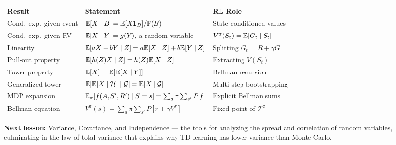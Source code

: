 \documentclass[11pt,a4paper]{article}
\begin{document}
\begin{center}
\renewcommand{\arraystretch}{1.4}
\begin{tabular}{p{4.5cm} p{5cm} p{4.5cm}}
\toprule
\textbf{Result} & \textbf{Statement} & \textbf{RL Role} \\
\midrule
Cond.\ exp.\ given event &
  $\mathbb{E}[X \mid B] = \mathbb{E}[X \mathbf{1}_B]/\mathbb{P}(B)$ &
  State-conditioned values \\
Cond.\ exp.\ given RV &
  $\mathbb{E}[X \mid Y] = g(Y)$, a random variable &
  $V^\pi(S_t) = \mathbb{E}[G_t \mid S_t]$ \\
Linearity &
  $\mathbb{E}[aX + bY \mid Z] = a\mathbb{E}[X \mid Z] + b\mathbb{E}[Y \mid Z]$ &
  Splitting $G_t = R + \gamma G$ \\
Pull-out property &
  $\mathbb{E}[h(Z) X \mid Z] = h(Z) \mathbb{E}[X \mid Z]$ &
  Extracting $V(S_t)$ \\
Tower property &
  $\mathbb{E}[X] = \mathbb{E}[\mathbb{E}[X \mid Y]]$ &
  Bellman recursion \\
Generalized tower &
  $\mathbb{E}[\mathbb{E}[X \mid \mathcal{H}] \mid \mathcal{G}]
    = \mathbb{E}[X \mid \mathcal{G}]$ &
  Multi-step bootstrapping \\
MDP expansion &
  $\mathbb{E}_\pi[f(A,S',R') \mid S = s] = \sum_a \pi \sum_{s'} P\, f$ &
  Explicit Bellman sums \\
Bellman equation &
  $V^\pi(s) = \sum_a \pi \sum_{s'} P[r + \gamma V^\pi]$ &
  Fixed-point of $\mathcal{T}^\pi$ \\
\bottomrule
\end{tabular}
\end{center}

\medskip
\noindent\textbf{Next lesson:} Variance, Covariance, and
Independence --- the tools for analyzing the spread and
correlation of random variables, culminating in the law of total
variance that explains why TD learning has lower variance than
Monte Carlo.


\end{document}
